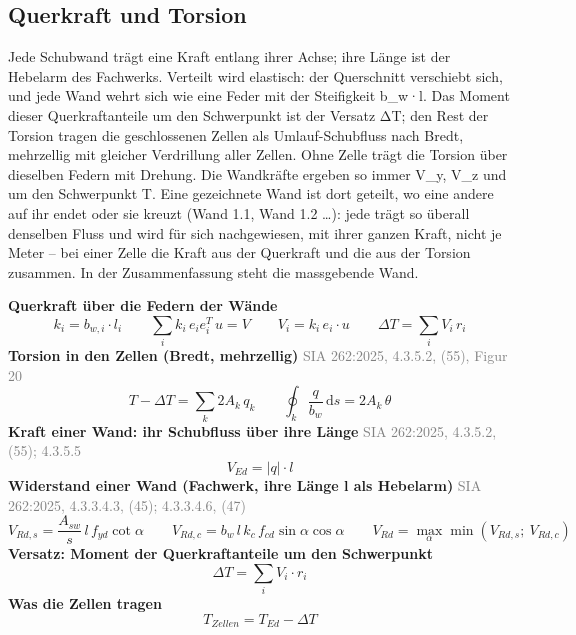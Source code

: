\documentclass[11pt,a4paper]{article}
\newcommand{\normref}[1]{{\small\textcolor{gray}{#1}}}
\begin{document}
\subsection{Querkraft und Torsion}
Jede Schubwand trägt eine Kraft entlang ihrer Achse; ihre Länge ist der Hebelarm des Fachwerks. Verteilt wird elastisch: der Querschnitt verschiebt sich, und jede Wand wehrt sich wie eine Feder mit der Steifigkeit b\_w·l. Das Moment dieser Querkraftanteile um den Schwerpunkt ist der Versatz ΔT; den Rest der Torsion tragen die geschlossenen Zellen als Umlauf-Schubfluss nach Bredt, mehrzellig mit gleicher Verdrillung aller Zellen. Ohne Zelle trägt die Torsion über dieselben Federn mit Drehung. Die Wandkräfte ergeben so immer V\_y, V\_z und um den Schwerpunkt T. Eine gezeichnete Wand ist dort geteilt, wo eine andere auf ihr endet oder sie kreuzt (Wand 1.1, Wand 1.2 …): jede trägt so überall denselben Fluss und wird für sich nachgewiesen, mit ihrer ganzen Kraft, nicht je Meter -- bei einer Zelle die Kraft aus der Querkraft und die aus der Torsion zusammen. In der Zusammenfassung steht die massgebende Wand.

\noindent\textbf{Querkraft über die Federn der Wände}
\begin{equation*}
k_i = b_{w,i} \cdot l_i \qquad \sum_i k_i\, e_i e_i^T\, u = V \qquad V_i = k_i\, e_i \cdot u \qquad \Delta T = \sum_i V_i\, r_i
\end{equation*}
\noindent\textbf{Torsion in den Zellen (Bredt, mehrzellig)} \hfill \normref{SIA 262:2025, 4.3.5.2, (55), Figur 20}
\begin{equation*}
T - \Delta T = \sum_k 2 A_k\, q_k \qquad \oint_k \frac{q}{b_w}\, \mathrm{d}s = 2 A_k\, \theta
\end{equation*}
\noindent\textbf{Kraft einer Wand: ihr Schubfluss über ihre Länge} \hfill \normref{SIA 262:2025, 4.3.5.2, (55); 4.3.5.5}
\begin{equation*}
V_{Ed} = |q| \cdot l
\end{equation*}
\noindent\textbf{Widerstand einer Wand (Fachwerk, ihre Länge l als Hebelarm)} \hfill \normref{SIA 262:2025, 4.3.3.4.3, (45); 4.3.3.4.6, (47)}
\begin{equation*}
V_{Rd,s} = \frac{A_{sw}}{s}\, l\, f_{yd} \cot\alpha \qquad V_{Rd,c} = b_w\, l\, k_c\, f_{cd} \sin\alpha \cos\alpha \qquad V_{Rd} = \max_\alpha \min(V_{Rd,s};\ V_{Rd,c})
\end{equation*}
\noindent\textbf{Versatz: Moment der Querkraftanteile um den Schwerpunkt}
\begin{equation*}
\Delta T = \sum_i V_i \cdot r_i
\end{equation*}
\noindent\textbf{Was die Zellen tragen}
\begin{equation*}
T_{Zellen} = T_{Ed} - \Delta T
\end{equation*}
\end{document}
